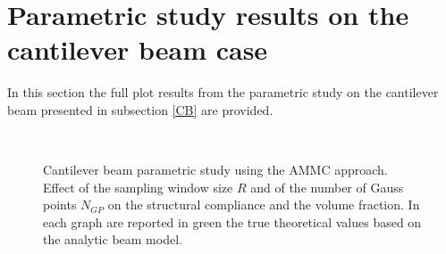 \section{Parametric study results on the cantilever beam case}
In this section the full plot results from the parametric study on the cantilever beam presented in subsection \ref{CB} are provided.
\begin{figure}
\centering
    \quad
    \\
    \quad
    \caption{Cantilever beam parametric study using the AMMC approach. Effect of the sampling window size $R$ and of the number of Gauss points $N_{GP}$ on the structural compliance and the volume fraction. In each graph are reported in green the true theoretical values based on the analytic beam model.}%
    \label{fig:cbMMC}%
\end{figure}
